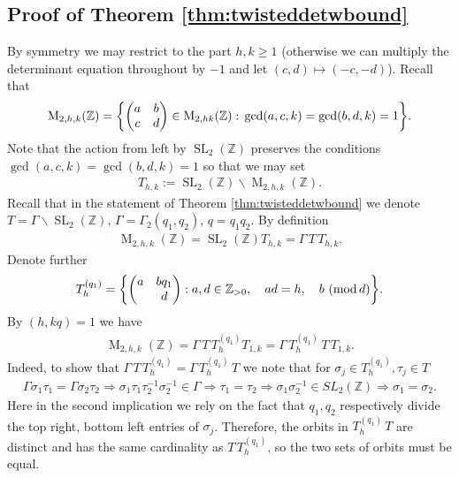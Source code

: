 \documentclass[12pt]{amsart}
\theoremstyle{definition}
\theoremstyle{remark}
\numberwithin{equation}{section}
\newcommand{\Z}{{\mathbb Z}}
\newcommand{\1}{{\mathbf 1}}
\newcommand{\SL}{\operatorname{SL}_2}
\newcommand{\MM}{\operatorname{M}}
\renewcommand{\pmod}[1]{\,\,(\mathrm{mod}\,{#1})}
\begin{document}
\subsection{Proof of Theorem \ref{thm:twisteddetwbound}} \label{section:twist}
By symmetry we may restrict to the part $h,k \geq 1$ (otherwise we can multiply the determinant equation throughout by $-1$ and let $(c,d) \mapsto (-c,-d)$). Recall that
\begin{align*}
    \MM_{2,h,k}(\Z) = \bigg\{ \mqty(a &b \\ c &d) \in \MM_{2,hk}(\Z): \, \gcd(a,c,k)=\gcd(b,d,k)=1 \bigg\}.
\end{align*}
Note that the action from left by $\SL(\Z)$ preserves the conditions $\gcd(a,c,k)=\gcd(b,d,k)=1$ so that we may set 
\begin{align*}
  T_{h,k} := \SL(\Z) \backslash   \MM_{2,h,k}(\Z).
\end{align*}
Recall that in the statement of Theorem \ref{thm:twisteddetwbound}  we denote $T = \Gamma \backslash \SL(\Z)$, $\Gamma=\Gamma_2(q_1,q_2)$, $q=q_1 q_2$. By definition
\begin{align*}
    \MM_{2,h ,k}(\Z) =  \SL(\Z)  T_{h,k} = \Gamma \, T \, T_{h,k}.
\end{align*}
Denote further
\begin{align*}
    T_{h}^{(q_1)} = \bigg\{ \mqty(a & bq_1 \\ & d): a,d \in \Z_{>0}, \quad ad = h, \quad b \pmod{d} \bigg\}.
\end{align*}
By $(h,kq) = 1$ we have
\begin{align} \label{eq:swaoheckeandT}
      \MM_{2,h, k}(\Z) =   \Gamma \, T \,  T_{h}^{(q_1)} T_{1,k} =    \Gamma \, T_{h}^{(q_1)}\, T \,  T_{1,k}.
\end{align}
Indeed, to show that $\Gamma \, T \,  T_{h}^{(q_1)} = \Gamma \,T_{h}^{(q_1)} \, T  $ we note that for $\sigma_j \in T_{h}^{(q_1)}, \tau_j \in T$
\begin{align*}
    \Gamma \sigma_1 \tau_1 =   \Gamma \sigma_2 \tau_2 \Rightarrow \sigma_1 \tau_1 \tau_2^{-1} \sigma_2^{-1} \in \Gamma \Rightarrow \tau_1 = \tau_2  \Rightarrow  \sigma_1 \sigma_2^{-1} \in SL_2(\Z) \Rightarrow \sigma_1 = \sigma_2.
\end{align*}
Here in the second implication we rely on the fact that  $q_1,q_2$ respectively divide the top right, bottom left entries of $\sigma_j$. Therefore, the orbits in $T_{h}^{(q_1)} \, T $ are distinct and has the same cardinality as $T \,  T_{h}^{(q_1)}$, so the two sets of orbits must be equal.
\end{document}
